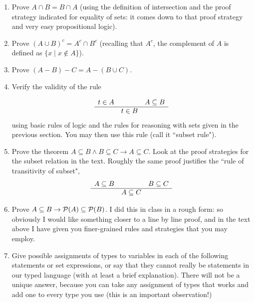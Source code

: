 \documentclass[12pt]{book}
\begin{document}
\begin{enumerate}

\item Prove $A \cap B = B \cap A$ (using the definition of intersection and the proof strategy indicated for equality of sets:  it comes down to that proof strategy and very easy propositional logic).

\item Prove $(A \cup B)^c = A^c \cap B^c$ (recalling that $A^c$, the complement of $A$ is defined as $\{x \mid x \not\in A\}$).

\item Prove $(A - B)-C = A-(B\cup C)$.

\item Verify the validity of the rule

$$\begin{array}{ccc}

 t \in A& &A \subseteq B \\ \hline

&t \in B&

\end{array}$$  using basic rules of logic and the rules for reasoning with sets given in the previous section.  You may then use this rule (call it ``subset rule").

\item Prove the theorem $A \subseteq B \wedge B \subseteq C \rightarrow A \subseteq C$.  Look at the proof strategies for the subset relation in the text.  Roughly the same proof
justifies the ``rule of transitivity of subset", $$\begin{array}{ccc}
A \subseteq B & & B \subseteq C \\ \hline

& A \subseteq C & \end{array}$$

\item Prove $A \subseteq B \rightarrow {\cal P}(A) \subseteq {\cal P}(B)$.  I did this in class in a rough form:  so obviously I would like something closer to a line by line proof,
and in the text above I have given you finer-grained rules and strategies that you may employ.

\item  Give possible assignments of types to variables in each of the following statements or set expressions, or say that they cannot really be statements in our typed language
(with at least a brief explanation).  There will not be a unique answer, because you can take any assignment of types that works and add one to every type you use (this is an important observation!)


\end{enumerate}
\end{document}
